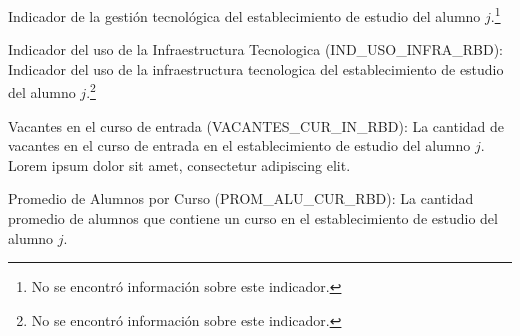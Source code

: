 \begin{longdescription}
     Indicador de la gestión tecnológica del establecimiento de estudio del alumno $j$.\footnote{No se encontró información sobre este indicador.}
     \item[Indicador del uso de la Infraestructura Tecnologica](IND\_USO\_INFRA\_RBD):
     Indicador del uso de la infraestructura tecnologica del establecimiento de estudio del alumno $j$.\footnote{No se encontró información sobre este indicador.}
     \item[Vacantes en el curso de entrada](VACANTES\_CUR\_IN\_RBD):
     La cantidad de vacantes en el curso de entrada en el establecimiento de estudio del alumno $j$.
     Lorem ipsum dolor sit amet, consectetur adipiscing elit.
     \item[Promedio de Alumnos por Curso](PROM\_ALU\_CUR\_RBD):
        La cantidad promedio de alumnos que contiene un curso en el establecimiento de estudio del alumno $j$.
\end{longdescription}